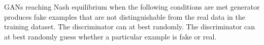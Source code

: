 GANs reaching Nash equilibrium when the following conditions are met generator produces fake examples that are not distinguishable from the real data in the training dataset. The discriminator can at best randomly. The discriminator can at best randomly guess whether a particular example is fake or real.  

 

